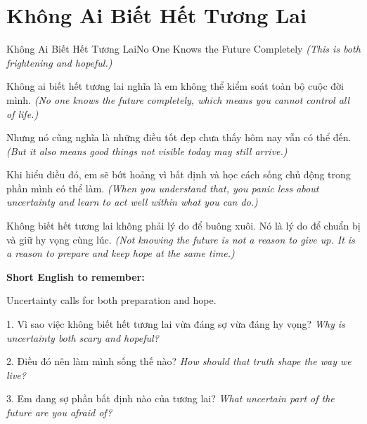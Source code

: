\section{Không Ai Biết Hết Tương Lai}
\begin{truyen}{Không Ai Biết Hết Tương Lai}{No One Knows the Future Completely}
\textit{(This is both frightening and hopeful.)}

Không ai biết hết tương lai nghĩa là em không thể kiểm soát toàn bộ cuộc đời mình.
\textit{(No one knows the future completely, which means you cannot control all of life.)}

Nhưng nó cũng nghĩa là những điều tốt đẹp chưa thấy hôm nay vẫn có thể đến.
\textit{(But it also means good things not visible today may still arrive.)}

Khi hiểu điều đó, em sẽ bớt hoảng vì bất định và học cách sống chủ động trong phần mình có thể làm.
\textit{(When you understand that, you panic less about uncertainty and learn to act well within what you can do.)}
\end{truyen}

\begin{baihoc}
Không biết hết tương lai không phải lý do để buông xuôi. Nó là lý do để chuẩn bị và giữ hy vọng cùng lúc.
\textit{(Not knowing the future is not a reason to give up. It is a reason to prepare and keep hope at the same time.)}
\end{baihoc}

\begin{ghinhoanh}
\textbf{Short English to remember:}

Uncertainty calls for both preparation and hope.

\end{ghinhoanh}

\begin{tuhocnhanh}
1. Vì sao việc không biết hết tương lai vừa đáng sợ vừa đáng hy vọng? \textit{Why is uncertainty both scary and hopeful?}

2. Điều đó nên làm mình sống thế nào? \textit{How should that truth shape the way we live?}

3. Em đang sợ phần bất định nào của tương lai? \textit{What uncertain part of the future are you afraid of?}
\end{tuhocnhanh}
\ngancach

